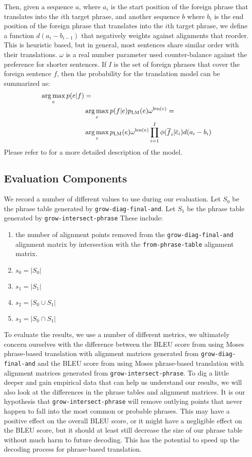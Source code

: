 \documentclass[twocolumn]{article}
\newcommand{\linespacing}{
  \onehalfspacing
}
\newcommand{\originalAlign}{\texttt{grow-diag-final-and}}
\newcommand{\phraseAlign}{\texttt{from-phrase-table}}
\newcommand{\phraseIntersectAlign}{\texttt{grow-intersect-phrase}}
\newcommand{\wrapSingleSpacing}[1]{
  \singlespacing
  #1
  \linespacing{}
}
\begin{document}
Then, given a sequence $a$, where $a_i$ is the start position of the foreign
phrase that translates into the $i$th target phrase,
and another sequence $b$ where $b_i$ is the end position of the foreign phrase
that translates into the $i$th target phrase,
we define a function $d(a_i - b_{i-1})$ that negatively weights against
alignments that reorder. This is heuristic based, but in general, most sentences
share similar order with their translations. $\omega$ is a real number
parameter used counter-balance against the preference for shorter sentences.
If $I$ is the set of foreign phrases that cover the foreign sentence $f$, then
the probability for the translation model can be summarized as:
\begin{align*}
  \operatorname*{arg\,max}_e p(e|f) & = \\
      & \operatorname*{arg\,max}_e p(f|e) p_{\text{LM}}(e) \omega^{\text{len}(e)} = \\
      & \operatorname*{arg\,max}_e p_{\text{LM}}(e) \omega^{\text{len}(e)}
                  \prod_{i=1}^I \phi(\overline{f}_i | \overline{e}_i)
                              d(a_i - b_{i})
\end{align*}
Please refer to \cite{kom2003} for a more detailed description of the model.


\subsection{Evaluation Components}
We record a number of different values to use during our evaluation.
Let $S_0$ be the phrase table generated by \originalAlign{}.
Let $S_1$ be the phrase table generated by \phraseIntersectAlign{}
These include:
\wrapSingleSpacing{
\begin{enumerate}
  \item the number of alignment points removed from
    the \originalAlign{} alignment matrix
    by intersection with
    the \phraseAlign{} alignment matrix.
  \item $s_0 = |S_0|$
  \item $s_1 = |S_1|$
  \item $s_2 = |S_0 \cup S_1|$
  \item $s_3 = |S_0 \cap S_1|$
\end{enumerate}
}

To evaluate the results, we use a number of different metrics, we ultimately
concern ourselves with the difference between the BLEU score from using Moses
phrase-based translation with alignment matrices generated from \originalAlign{}
and the BLEU score from using Moses phrase-based translation with alignment
matrices generated from \phraseIntersectAlign{}.
To dig a little deeper and gain empirical data that can help us understand our
results, we will also look at the differences in the phrase tables and alignment
matrices. It is our hypothesis that \phraseIntersectAlign{} will remove outlying
points that never happen to fall into the most common or probable phrases. This
may have a positive effect on the overall BLEU score, or it might have a
negligible effect on the BLEU score, but it should at least still decrease the
size of our phrase table without much harm to future decoding. This has the
potential to speed up the decoding process for phrase-based translation.
\end{document}
